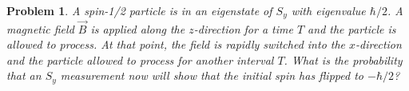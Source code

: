 \documentclass{article}
\newtheorem{plm}{Problem}
\begin{document}
\begin{plm}
  A spin-1/2 particle is in an eigenstate of $S_{y}$ with eigenvalue $\hbar/2$.
  A magnetic field $\vec{B}$ is applied along the $z$-direction for a time $T$ and the particle is allowed to process.
  At that point, the field is rapidly switched into the $x$-direction and the particle allowed to process for another interval $T$.
  What is the probability that an $S_{y}$ measurement now will show that the initial spin has flipped to $-\hbar/2$?
\end{plm}
\end{document}
